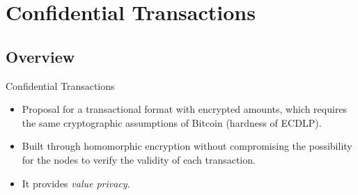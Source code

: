 \documentclass[usenames,dvipsnames]{beamer}
\begin{document}
    
    \section{Confidential Transactions}
    
    \subsection{Overview}
    \begin{frame}{Confidential Transactions}
        \begin{itemize}
            \item Proposal for a transactional format with encrypted amounts, which requires the same  cryptographic assumptions of Bitcoin (hardness of ECDLP).
            \item Built through homomorphic encryption without compromising the possibility for the nodes to verify the validity of each transaction.
            \item It provides \textit{value privacy}.
        \end{itemize}
    \end{frame}
    
\end{document}
